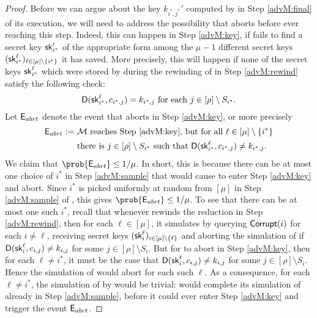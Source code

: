 \begin{proof}
  Before we can argue about the key \(k_{i^{*},j^{*}}'\) computed by
  \redM in Step \ref{advM:final} of its execution,
  we will need to address the possibility that \redM aborts
  before ever reaching this step.
  Indeed, this can happen in Step \ref{advM:key},
  if \redM fails to find a secret key \(\mathsf{sk}_{i^{*}}'\)
  of the appropriate form among the \(\mu - 1\)
  different secret keys \((\mathsf{sk}_{i^{*}}^{\ell})_{\ell \in [\mu] \setminus \{i^{*}\}}\) it has saved.
  More precisely, this will happen if
  none of the secret keys \(\mathsf{sk}_{i^{*}}^{\ell}\)
  which were stored by \redM during the rewinding of \redR in Step \ref{advM:rewind}
  satisfy the following check:
  \begin{equation}\label{skcheck}
  \mathsf{D}(\mathsf{sk}_{i^{*}}^{\ell},c_{i^{*},j}) = k_{i^{*},j}
  \text{ for each } j \in [\rho] \setminus S_{i^{*}}.
  \end{equation}
  Let \(\mathsf{E}_{abrt}\) denote the event that \redM aborts in Step \ref{advM:key}, or more precisely
  \begin{align}
    \eventE_{abrt} := & \text{ \redM reaches Step \ref{advM:key}, but for all } \ell \in [\mu] \setminus \{i^{*}\}\notag\\
    & \text{ there is } j \in [\rho] \setminus S_{i^{*}}
    \text{ such that } \Decaps(\sk_{i^{*}}^{\ell},c_{i^{*},j}) \ne k_{i^{*},j}. \notag
  \end{align}
  We claim that \(\prob{\eventE_{abrt}} \le 1/\mu\).
  In short, this is because there can be at most one choice of \(i^{*}\)
  in Step \ref{advM:sample} that would cause \redM to enter Step \ref{advM:key} and abort.
  Since \(i^{*}\) is picked uniformly at random from \([\mu]\) in Step \ref{advM:sample} of \redM,
  this gives \(\prob{\eventE_{abrt}} \le 1/\mu\).
  To see that there can be at most one such \(i^{*}\),
  recall that whenever \redM rewinds the reduction \redR
  in Step \ref{advM:rewind},
  then for each \(\ell \in [\mu]\),
  it simulates \advA by querying \(\mathsf{Corrupt}(i)\) for each \(i \ne \ell\),
  receiving secret keys \((\mathsf{sk}_{i}^{\ell})_{i \in [\mu] \setminus \{\ell\}}\)
  and aborting the simulation of \advA if
  \(\mathsf{D}(\mathsf{sk}_{i}^{\ell},c_{i,j}) \ne k_{i,j}\) for some \(j \in [\rho] \setminus S_{i}\).
  But for \redM to abort in Step \ref{advM:key},
  then for each \(\ell \ne i^{*}\),
  it must be the case that
  \(\mathsf{D}(\mathsf{sk}_{i}^{\ell},c_{i,j}) \ne k_{i,j}\) for some \(j \in [\rho] \setminus S_{i}\).
  Hence the simulation of \advA would abort for each such \(\ell\).
  As a consequence, for each \(\ell \ne i^{*}\), the simulation of \advA by \redM would be trivial:
  \redM would complete its simulation of \advA already in Step \ref{advM:sample},
  before it could ever enter Step \ref{advM:key} and trigger the event \(\mathsf{E}_{abrt}\).


\end{proof}
